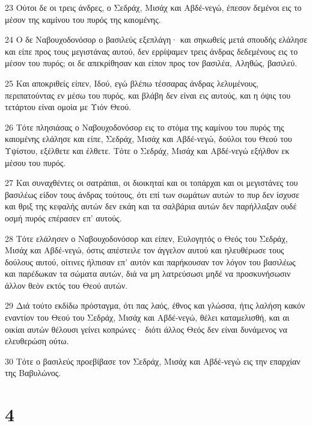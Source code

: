 \par 23 Ούτοι δε οι τρεις άνδρες, ο Σεδράχ, Μισάχ και Αβδέ-νεγώ, έπεσον δεμένοι εις το μέσον της καμίνου του πυρός της καιομένης.
\par 24 Ο δε Ναβουχοδονόσορ ο βασιλεύς εξεπλάγη· και σηκωθείς μετά σπουδής ελάλησε και είπε προς τους μεγιστάνας αυτού, δεν ερρίψαμεν τρεις άνδρας δεδεμένους εις το μέσον του πυρός; οι δε απεκρίθησαν και είπον προς τον βασιλέα, Αληθώς, βασιλεύ.
\par 25 Και αποκριθείς είπεν, Ιδού, εγώ βλέπω τέσσαρας άνδρας λελυμένους, περιπατούντας εν μέσω του πυρός, και βλάβη δεν είναι εις αυτούς, και η όψις του τετάρτου είναι ομοία με Υιόν Θεού.
\par 26 Τότε πλησιάσας ο Ναβουχοδονόσορ εις το στόμα της καμίνου του πυρός της καιομένης ελάλησε και είπε, Σεδράχ, Μισάχ και Αβδέ-νεγώ, δούλοι του Θεού του Υψίστου, εξέλθετε και έλθετε. Τότε ο Σεδράχ, Μισάχ και Αβδέ-νεγώ εξήλθον εκ μέσου του πυρός.
\par 27 Και συναχθέντες οι σατράπαι, οι διοικηταί και οι τοπάρχαι και οι μεγιστάνες του βασιλέως είδον τους άνδρας τούτους, ότι επί των σωμάτων αυτών το πυρ δεν ίσχυσε και θριξ της κεφαλής αυτών δεν εκάη και τα σαλβάρια αυτών δεν παρήλλαξαν ουδέ οσμή πυρός επέρασεν επ' αυτούς.
\par 28 Τότε ελάλησεν ο Ναβουχοδονόσορ και είπεν, Ευλογητός ο Θεός του Σεδράχ, Μισάχ και Αβδέ-νεγώ, όστις απέστειλε τον άγγελον αυτού και ηλευθέρωσε τους δούλους αυτού, οίτινες ήλπισαν επ' αυτόν και παρήκουσαν τον λόγον του βασιλέως και παρέδωκαν τα σώματα αυτών, διά να μη λατρεύσωσι μηδέ να προσκυνήσωσιν άλλον θεόν εκτός του Θεού αυτών.
\par 29 Διά τούτο εκδίδω πρόσταγμα, ότι πας λαός, έθνος και γλώσσα, ήτις λαλήση κακόν εναντίον του Θεού του Σεδράχ, Μισάχ και Αβδέ-νεγώ, θέλει καταμελισθή, και αι οικίαι αυτών θέλουσι γείνει κοπρώνες· διότι άλλος Θεός δεν είναι δυνάμενος να ελευθερώση ούτω.
\par 30 Τότε ο βασιλεύς προεβίβασε τον Σεδράχ, Μισάχ και Αβδέ-νεγώ εις την επαρχίαν της Βαβυλώνος.

\chapter{4}

